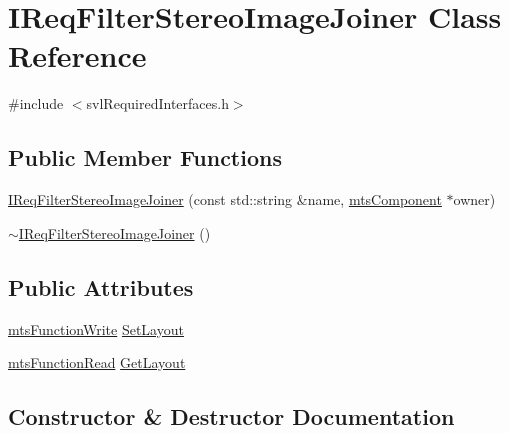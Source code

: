 \hypertarget{class_i_req_filter_stereo_image_joiner}{}\section{I\+Req\+Filter\+Stereo\+Image\+Joiner Class Reference}
\label{class_i_req_filter_stereo_image_joiner}


{\ttfamily \#include $<$svl\+Required\+Interfaces.\+h$>$}

\subsection*{Public Member Functions}
\begin{DoxyCompactItemize}
\item 
\hyperlink{class_i_req_filter_stereo_image_joiner_a38b9f6681dd0448013184e714d353925}{I\+Req\+Filter\+Stereo\+Image\+Joiner} (const std\+::string \&name, \hyperlink{classmts_component}{mts\+Component} $\ast$owner)
\item 
\hyperlink{class_i_req_filter_stereo_image_joiner_a820977ea07d10846550aa1663f0e3115}{$\sim$\+I\+Req\+Filter\+Stereo\+Image\+Joiner} ()
\end{DoxyCompactItemize}
\subsection*{Public Attributes}
\begin{DoxyCompactItemize}
\item 
\hyperlink{classmts_function_write}{mts\+Function\+Write} \hyperlink{class_i_req_filter_stereo_image_joiner_a5e2f7bb1b492d0001721ae8dea1348b7}{Set\+Layout}
\item 
\hyperlink{classmts_function_read}{mts\+Function\+Read} \hyperlink{class_i_req_filter_stereo_image_joiner_a39c729d4120ae4e0cc05b58d9e478812}{Get\+Layout}
\end{DoxyCompactItemize}


\subsection{Constructor \& Destructor Documentation}
\hypertarget{class_i_req_filter_stereo_image_joiner_a38b9f6681dd0448013184e714d353925}{}
